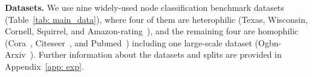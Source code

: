 % 
% 
\textbf{Datasets.} 
% 
We use nine widely-used node classification
benchmark datasets (Table~\ref{tab: main_data}), where four of them are heterophilic (Texas, Wisconsin, Cornell, Squirrel, and
Amazon-rating~\citep{platonov2023critical}), and the remaining four are homophilic (Cora~\citep{cora},
Citeseer~\citep{citeseer}, and Pubmed~\citep{pubmed}) including one large-scale dataset (Ogbn-Arxiv~\cite{hu2020ogb}). 
Further information about the datasets and splits are provided in Appendix~\ref{app: exp}.




